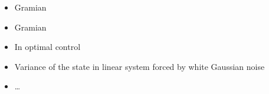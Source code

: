 \documentclass[letterpaper,10pt,english]{jupyterBook}
\begin{document}
\sphinxAtStartPar
{}
\begin{itemize}
\item {} 
\sphinxAtStartPar
{\hyperref[\detokenize{ch/system-theory/controllability-reachability:controllability-reachability}]{}} Gramian

\item {} 
\sphinxAtStartPar
{\hyperref[\detokenize{ch/system-theory/observability-detectability:observability-detectability}]{}} Gramian

\item {} 
\sphinxAtStartPar
In optimal control

\item {} 
\sphinxAtStartPar
Variance of the state in linear system forced by white Gaussian noise

\item {} 
\sphinxAtStartPar
…

\end{itemize}

\sphinxstepscope
\end{document}
